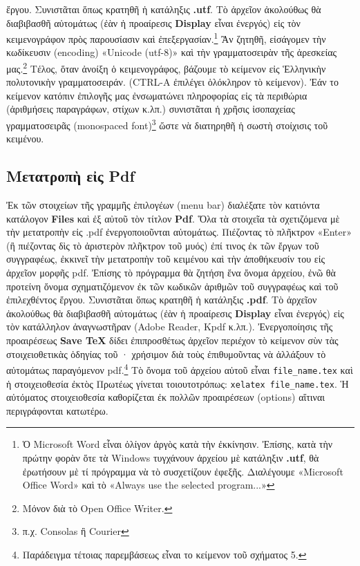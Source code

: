 \documentclass[12pt,a4paper]{article}
\begin{document}
    ἔργου. Συνιστᾶται ὅπως κρατηθῆ ἡ κατάληξις {\bf .utf}.
    Τὸ ἀρχεῖον ἀκολούθως θὰ διαβιβασθῆ αὐτομάτως
    (ἐὰν ἡ προαίρεσις {\bf Display} εἶναι ἐνεργός) εἰς τὸν κειμενογράφον πρὸς
    παρουσίασιν καὶ ἐπεξεργασίαν.\footnote{Ὁ Microsoft Word εἶναι ὀλίγον
                        ἀργὸς κατὰ τὴν ἐκκίνησιν.  Ἐπίσης, κατὰ τὴν πρώτην
                        φορὰν ὅτε τὰ Windows τυγχάνουν ἀρχείου μὲ κατάληξιν
                        {\bf .utf}, θὰ ἐρωτήσουν μὲ τί πρόγραμμα νὰ τὸ
                        συσχετίζουν ἐφεξῆς. Διαλέγουμε «Microsoft Office Word»
                        καὶ τὸ «Always use the selected program...»}
    Ἂν ζητηθῆ, εἰσάγομεν τὴν κωδίκευσιν (encoding) «Unicode (utf-8)» καὶ τὴν
    γραμματοσειρὰν τῆς ἀρεσκείας μας.\footnote{Μόνον διὰ τὸ Open Office Writer.}
    Τέλος, ὅταν ἀνοίξη ὁ κειμενογράφος, βάζουμε τὸ κείμενον εἰς Ἑλληνικὴν
    πολυτονικὴν γραμματοσειράν. (CTRL-A ἐπιλέγει ὁλόκληρον τὸ κείμενον).
    Ἐάν το κείμενον κατόπιν ἐπιλογῆς μας ἐνσωματώνει πληροφορίας εἰς τὰ
    περιθώρια (ἀριθμήσεις παραγράφων, στίχων κ.λπ.) συνιστᾶται ἡ χρῆσις
    ἰσοπαχείας γραμματοσειρᾶς (monospaced font)\footnote{
                                              π.χ. Consolas ἢ Courier}
    ὥστε νὰ διατηρηθῆ ἡ σωστὴ στοίχισις τοῦ κειμένου.
  \subsection{Μετατροπὴ εἰς Pdf}
    Ἐκ τῶν στοιχείων τῆς γραμμῆς ἐπιλογέων (menu bar)
    διαλέξατε τὸν κατιόντα κατάλογον {\bf Files}
    καὶ ἐξ αὐτοῦ τὸν τίτλον {\bf Pdf}.
    Ὅλα τὰ στοιχεῖα τὰ σχετιζόμενα μὲ τὴν
    μετατροπὴν εἰς .pdf ἐνεργοποιοῦνται αὐτομάτως.
    Πιέζοντας τὸ πλῆκτρον «Enter» (ἢ πιέζοντας δὶς τὸ
    ἀριστερὸν πλῆκτρον τοῦ μυός) ἐπί τινος ἐκ τῶν ἔργων
    τοῦ συγγραφέως, ἐκκινεῖ τὴν μετατροπὴν τοῦ κειμένου
    καὶ τὴν ἀποθήκευσίν του εἰς ἀρχεῖον μορφῆς pdf.
    Ἐπίσης τὸ πρόγραμμα θὰ ζητήση ἕνα ὄνομα ἀρχείου,
    ἐνῶ θὰ προτείνη ὄνομα σχηματιζόμενον ἐκ τῶν κωδικῶν
    ἀριθμῶν τοῦ συγγραφέως καὶ τοῦ ἐπιλεχθέντος
    ἔργου. Συνιστᾶται ὅπως κρατηθῆ ἡ κατάληξις {\bf .pdf}.
    Τὸ ἀρχεῖον ἀκολούθως θὰ διαβιβασθῆ αὐτομάτως (ἐὰν ἡ
    προαίρεσις {\bf Display} εἶναι ἐνεργός)  εἰς τὸν κατάλληλον
    ἀναγνωστῆραν (Adobe Reader, Kpdf κ.λπ.).
    Ἐνεργοποίησις τῆς προαιρέσεως {\bf Save TeX} δίδει ἐπιπροσθέτως
    ἀρχεῖον περιέχον τὸ κείμενον
    σὺν τὰς στοιχειοθετικὰς ὁδηγίας τοῦ \XeTeX· χρήσιμον διὰ
    τοὺς ἐπιθυμοῦντας νὰ ἀλλάξουν τὸ αὐτομάτως
    παραγόμενον pdf.\footnote{Παράδειγμα τέτοιας παρεμβάσεως
                              εἶναι το κείμενον τοῦ σχήματος 5.}
    Τὸ ὄνομα τοῦ ἀρχείου αὐτοῦ εἶναι {\tt file\_name.tex} καὶ ἡ
    στοιχειοθεσία ἐκτὸς Πρωτέως γίνεται τοιουτοτρόπως:
    {\tt xelatex file\_name.tex}.
    Ἡ αὐτόματος στοιχειοθεσία καθορίζεται ἐκ πολλῶν προαιρέσεων
    (options) αἵτιναι περιγράφονται κατωτέρω.
\end{document}
